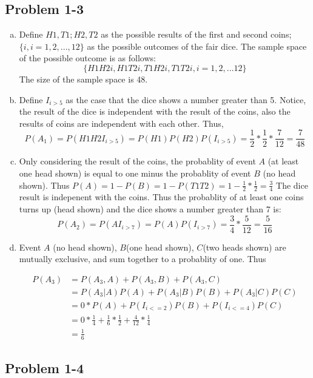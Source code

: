 \documentclass[]{book}
\theoremstyle{definition}
\begin{document}
\subsection*{Problem 1-3}
\begin{enumerate}[(a)] %
	\item Define $H1, T1; H2, T2$ as the possible results of the first and second coins; $\{i, i = 1, 2, ..., 12\}$ as the possible outcomes of the fair dice.  \newline
	The sample space of the possible outcome is as follows: 
	$$\{H1H2i,H1T2i,T1H2i,T1T2i, i = 1, 2, ...12 \}$$
	The size of the sample space is 48. 
	
	\item Define $I_{i>5}$ as the case that the dice shows a number greater than 5. Notice, the result of the dice is independent with the result of the coins, also the results of coins are independent with each other.  Thus, 
	$$P(A_{1}) = P(H1H2I_{i>5})= P(H1)P(H2)P(I_{i>5}) = \frac{1}{2}*\frac{1}{2}*\frac{7}{12} = \frac{7}{48}$$
	
	\item Only considering the result of the coins, the probablity of event $A$ (at least one head shown) is equal to one minus the probablity of event $B$ (no head shown). 
	Thus $P(A) = 1 - P(B) = 1 - P(T1T2)= 1- \frac{1}{2}*\frac{1}{2} = \frac{3}{4}$
	The dice result is indepenent with the coins. Thus the probablity of at least one coins turns up (head shown) and the dice shows a number greater than 7 is: 
	$$P(A_{2}) = P(AI_{i>7}) = P(A)P(I_{i>7}) = \frac{3}{4}*\frac{5}{12} = \frac{5}{16}$$
	
	\item Event $A$ (no head shown), $B$(one head shown), $C$(two heads shown) are mutually exclusive, and sum together to a probablity of one. 
	Thus 
		
	\begin{align*}
	P(A_{3}) &= P(A_{3}, A) + P(A_{3}, B) + P(A_{3}, C)\\
	& = P(A_{3}|A) P(A) + P(A_{3}|B) P(B) + P(A_{3}|C) P(C)\\
	& = 0 * P(A) + P(I_{i<=2})P(B) + P(I_{i<=4})P(C)\\
	& = 0 * \frac{1}{4} + \frac{1}{6} * \frac{1}{2} + \frac{4}{12} *\frac{1}{4} \\
	& =  \frac{1}{6}
	\end{align*}										
\end{enumerate}

\subsection*{Problem 1-4}
\end{document}
